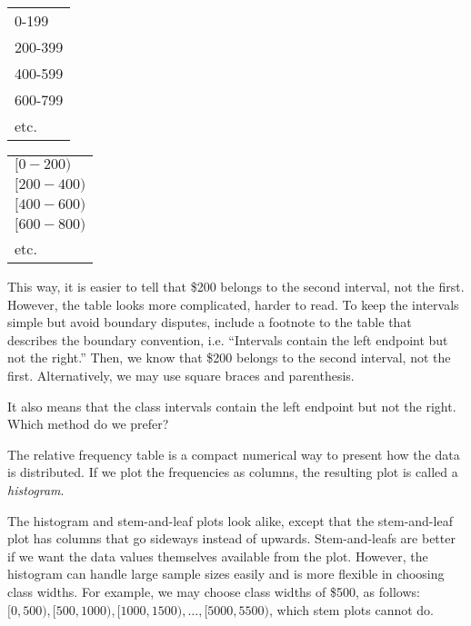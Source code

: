 \documentclass[11pt]{book}\usepackage[]{graphicx}\usepackage[]{color}
\begin{document}
\begin{minipage}[ht]{6cm}

\begin{tabular}{@{} l @{}} \hline
0-199 \\
200-399 \\
400-599 \\
600-799 \\
etc. \\ \hline
\end{tabular}

\end{minipage}
\begin{minipage}[ht]{6cm}

\begin{tabular}{@{} l @{}} \hline
$ [0-200)$ \\
$ [200-400)$ \\
$ [400-600)$ \\
$ [600-800)$ \\
 etc. \\ \hline
\end{tabular}
\end{minipage}

\vspace{3mm}

This way, it is easier to tell that \$200 belongs to the second interval, not the first.  However, the table looks more complicated, harder to read.  To keep the intervals simple but avoid boundary disputes, include a footnote to the table that describes the boundary convention, i.e. ``Intervals contain the left endpoint but not the right.''  Then, we know that \$200 belongs to the second interval, not the first.  Alternatively, we may use square braces and parenthesis.

It also means that the class intervals contain the left endpoint but not the right.  Which method do we prefer?

The relative frequency table is a compact numerical way to present how the data is distributed.  If we plot the frequencies as columns, the resulting plot is called a \textit{histogram}.

The histogram and stem-and-leaf plots look alike, except that the stem-and-leaf plot has columns that go sideways instead of upwards.  Stem-and-leafs are better if we want the data values themselves available from the plot.  However, the histogram can handle large sample sizes easily and is more flexible in choosing class widths.  For example, we may choose class widths of \$500, as follows: $[0,500), [500,1000), [1000,1500), \dots, [5000,5500)$, which stem plots cannot do.
\end{document}
